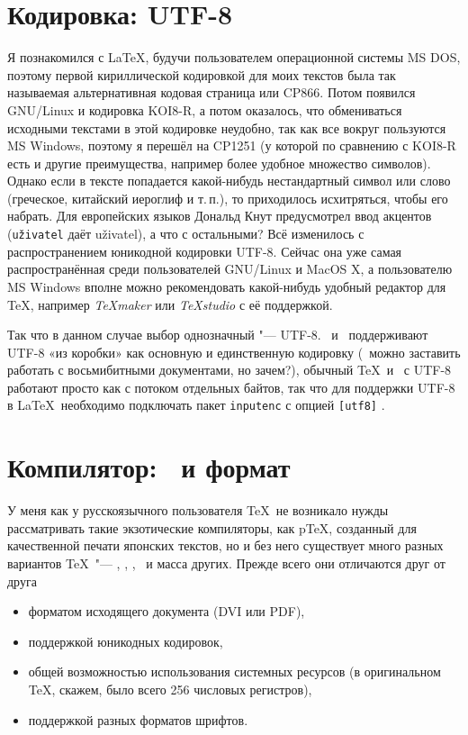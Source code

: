\documentclass[a4paper,12pt,hyphens]{article}
\newcommand\softname[1]{\textit{#1}}
\newcommand\package[1]{\texttt{#1}}
\newcommand\lcmd[1]{\texttt{#1}}
\begin{document}
\section{Кодировка: UTF-8}
Я познакомился с \LaTeX, будучи пользователем операционной системы MS DOS,
поэтому первой кириллической кодировкой для моих текстов была так называемая
альтернативная кодовая страница или CP866. Потом появился GNU/Linux и кодировка
KOI8-R, а потом оказалось, что обмениваться исходными текстами в этой кодировке
неудобно, так как все вокруг пользуются MS Windows, поэтому я перешёл на
CP1251 (у которой по сравнению с KOI8-R есть и другие преимущества, например
более удобное множество символов). Однако если в тексте попадается какой-нибудь
нестандартный символ или слово (греческое, китайский иероглиф и т.\,п.), то
приходилось исхитряться, чтобы его набрать. Для европейских языков Дональд Кнут
предусмотрел ввод акцентов (\lcmd{u\v{z}ivatel} даёт u\v{z}ivatel), а что с
остальными? Всё изменилось с распространением юникодной кодировки UTF-8. Сейчас
она уже самая распространённая среди пользователей GNU/Linux и MacOS X,
а пользователю MS Windows вполне можно рекомендовать какой-нибудь удобный
редактор для \TeX, например \softname{TeXmaker} \parencite{site-texmaker}
или \softname{TeXstudio} \parencite{site-texstudio} с её поддержкой.

Так что в данном случае выбор однозначный "--- UTF-8. \LuaTeX\ и \XeTeX\ поддерживают
UTF-8 «из коробки» как основную и единственную кодировку (\LuaLaTeX\ можно
заставить работать с восьмибитными документами, но зачем?), обычный \TeX\
и \pdfTeX\ с UTF-8 работают просто как с потоком отдельных байтов, так что
для поддержки UTF-8 в \LaTeX\ необходимо подключать пакет \package{inputenc}
с опцией \lcmd{[utf8]} \parencite{ctan-inputenc}.

\section{Компилятор: \LuaTeX\ и формат \LuaLaTeX}
У меня как у русскоязычного пользователя \TeX\ не возникало нужды рассматривать
такие экзотические компиляторы, как p\TeX, созданный для качественной печати японских
текстов, но и без него существует много разных вариантов \TeX\ "--- \eTeX, \pdfTeX,
\XeTeX, \LuaTeX\ и масса других. Прежде всего они отличаются
друг от друга
\begin{itemize}
\item форматом исходящего документа (DVI или PDF),
\item поддержкой юникодных кодировок,
\item общей возможностью использования системных ресурсов (в оригинальном \TeX,
скажем, было всего 256 числовых регистров),
\item поддержкой разных форматов шрифтов.
\end{itemize}
\end{document}
